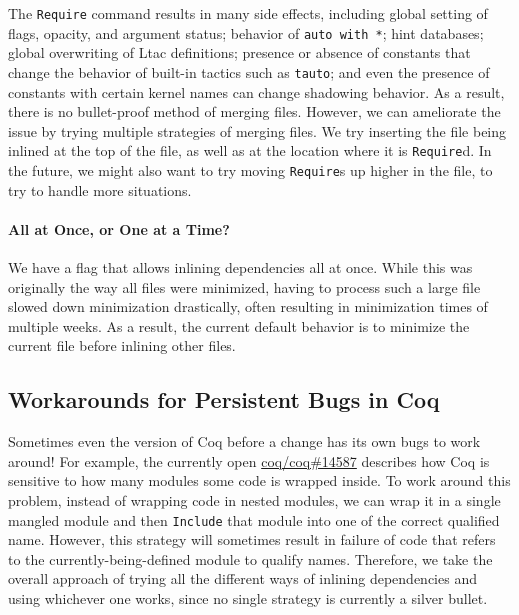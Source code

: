 \documentclass[a4paper,USenglish,cleveref,autoref,thm-restate]{lipics-v2021}
\newcommand{\coqbug}[1]{\href{https://github.com/coq/coq/issues/#1}{coq/coq\##1}}
\begin{document}
The \texttt{Require} command results in many side effects, including global setting of flags, opacity, and argument status; behavior of \texttt{auto with *}; hint databases; global overwriting of Ltac definitions; presence or absence of constants that change the behavior of built-in tactics such as \texttt{tauto}; and even the presence of constants with certain kernel names can change shadowing behavior.
As a result, there is no bullet-proof method of merging files.
However, we can ameliorate the issue by trying multiple strategies of merging files.
We try inserting the file being inlined at the top of the file, as well as at the location where it is \texttt{Require}d.
In the future, we might also want to try moving \texttt{Require}s up higher in the file, to try to handle more situations.

\paragraph{All at Once, or One at a Time?}

We have a flag that allows inlining dependencies all at once.
While this was originally the way all files were minimized, having to process such a large file slowed down minimization drastically, often resulting in minimization times of multiple weeks.
As a result, the current default behavior is to minimize the current file before inlining other files.

\subsection{Workarounds for Persistent Bugs in Coq}

Sometimes even the version of Coq before a change has its own bugs to work around!
For example, the currently open \coqbug{14587} describes how Coq is sensitive to how many modules some code is wrapped inside.
To work around this problem, instead of wrapping code in nested modules, we can wrap it in a single mangled module and then \texttt{Include} that module into one of the correct qualified name.
However, this strategy will sometimes result in failure of code that refers to the currently-being-defined module to qualify names.
Therefore, we take the overall approach of trying all the different ways of inlining dependencies and using whichever one works, since no single strategy is currently a silver bullet.


\end{document}
